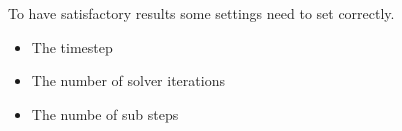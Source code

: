 To have satisfactory results some settings need to set correctly.
\begin{itemize}
\item The timestep
\item The number of solver iterations
\item The numbe of sub steps
\end{itemize}